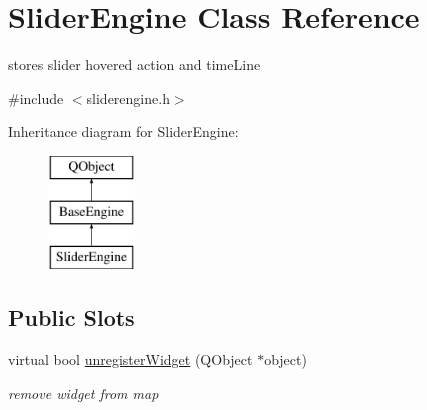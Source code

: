 \hypertarget{class_slider_engine}{}\section{Slider\+Engine Class Reference}
\label{class_slider_engine}


stores slider hovered action and time\+Line  




{\ttfamily \#include $<$sliderengine.\+h$>$}

Inheritance diagram for Slider\+Engine\+:\begin{figure}[H]
\begin{center}
\leavevmode
\includegraphics[height=3.000000cm]{class_slider_engine}
\end{center}
\end{figure}
\subsection*{Public Slots}
\begin{DoxyCompactItemize}
\item 
\mbox{\label{class_slider_engine_a6e504228327bf1934359c13cb3c7b707}} 
virtual bool \hyperlink{class_slider_engine_a6e504228327bf1934359c13cb3c7b707}{unregister\+Widget} (Q\+Object $\ast$object)
\begin{DoxyCompactList}\small\item\em remove widget from map \end{DoxyCompactList}\end{DoxyCompactItemize}
